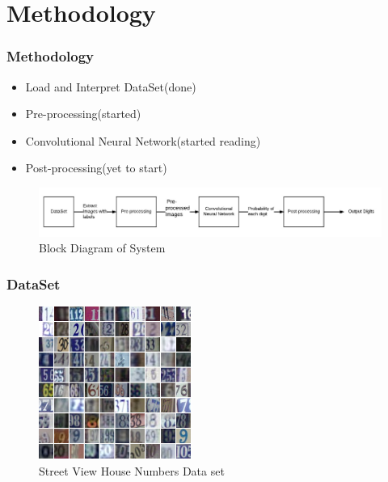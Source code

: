 \documentclass[11.5pt,aspectratio=1610,xcolor={usenames,dvipsnames,table}]{beamer}
\begin{document}



\section{Methodology}
\begin{frame}

\frametitle{Methodology}

\begin{itemize}
	\item Load and Interpret DataSet(done)
	\item Pre-processing(started)
	\item Convolutional Neural Network(started reading)
	\item Post-processing(yet to start)
\end{itemize}
\begin{figure}[!h]
	\includegraphics[width=\textwidth ]{block_diagram.png}
	\caption{Block Diagram of System}
\end{figure}

\end{frame}


\begin{frame}

\frametitle{DataSet}

\begin{figure}[!h]
	\includegraphics[width=\textwidth, height = 5cm]{dataset.png}
	\caption{Street View House Numbers Data set \cite{SVHN}}
\end{figure}

\end{frame}
\end{document}
